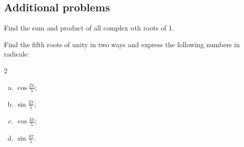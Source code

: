 
\subsection{Additional problems}

\begin{problem}
Find the sum and product of all complex $n$th roots of 1.
\end{problem}

\begin{problem}
Find the fifth roots of unity in two ways and express the following numbers in radicals:
\begin{multicols}{2}
\begin{enumerate}[a)]
\item $\cos \frac{2 \pi}{5}$;

\item $\sin \frac{2 \pi}{5}$;

\item $\cos \frac{4 \pi}{5}$;
\item $\sin \frac{4 \pi}{5}$.
\end{enumerate}
\end{multicols}
\end{problem}

